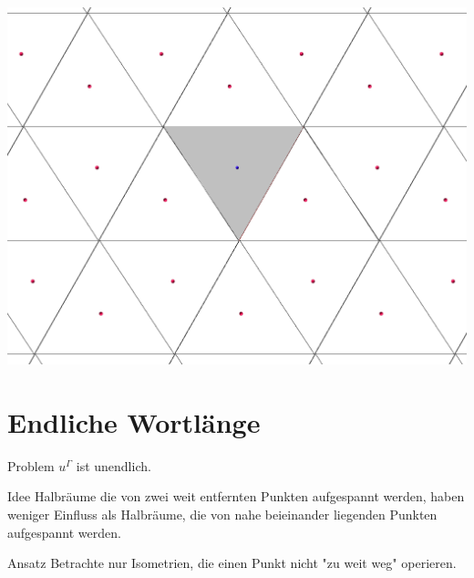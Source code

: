 \documentclass{beamer}
\theoremstyle{plain}
\newcommand{\T}{\mathcal{T}}
\begin{document}
\begin{frame}
    \centering
    \includegraphics[width=\textwidth]{images/p2-hex-dirichlet.png}
\end{frame}

\section{Endliche Wortlänge}

\begin{frame}
    \begin{alertblock}{Problem}
        $u^\Gamma$ ist unendlich.
    \end{alertblock}
\end{frame}

\begin{frame}
    \begin{block}{Idee}
        Halbräume die von zwei weit entfernten Punkten aufgespannt werden, haben weniger Einfluss als Halbräume, die von nahe beieinander liegenden Punkten aufgespannt werden.
    \end{block}
    \pause
    \begin{block}{Ansatz}
        Betrachte nur Isometrien, die einen Punkt nicht "zu weit weg" operieren.
    \end{block}
\end{frame}

\end{document}
